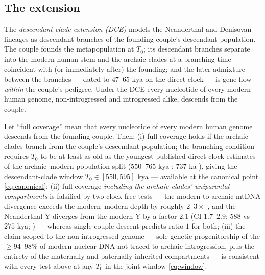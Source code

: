 \subsection{The extension}
The \emph{descendant-clade extension (DCE)} models the Neanderthal and
Denisovan lineages as descendant branches of the founding couple's
descendant population. The couple founds the metapopulation at $T_0$; its
descendant branches separate into the modern-human stem and the archaic
clades at a branching time coincident with (or immediately after) the
founding; and the later admixture between the branches --- dated to
$47$--$65$ kya on the direct clock \citep{Sankararaman2012} --- is gene flow
\emph{within} the couple's pedigree. Under the DCE every nucleotide of every
modern human genome, non-introgressed and introgressed alike, descends from
the couple.

\begin{theorem}\label{thm:scope}
Let ``full coverage'' mean that every nucleotide of every modern human
genome descends from the founding couple. Then:
(i) full coverage holds if the archaic clades branch from the couple's
descendant population; the branching condition requires $T_0$ to be at
least as old as the youngest published direct-clock estimates of the
archaic--modern population split ($550$--$765$ kya \citep{Pruefer2014};
$737$ ka \citealp{Rogers2020}), giving the descendant-clade window
$T_0 \in [550, 595]$ kya --- available at the canonical point
\eqref{eq:canonical};
(ii) full coverage \emph{including the archaic clades' uniparental
compartments} is falsified by two clock-free tests --- the
modern-to-archaic mtDNA divergence exceeds the modern--modern depth by
roughly $2$--$3\times$ \citep{Green2008,Posth2017}, and the Neanderthal Y
diverges from the modern Y by a factor $2.1$ (CI $1.7$--$2.9$; $588$ vs
$275$ kya; \citealp{Mendez2016}) --- whereas single-couple descent predicts
ratio $1$ for both;
(iii) the claim scoped to the non-introgressed genome --- sole genetic
progenitorship of the $\ge 94$--$98\%$ of modern nuclear DNA not traced to
archaic introgression, plus the entirety of the maternally and paternally
inherited compartments --- is consistent with every test above at any $T_0$
in the joint window \eqref{eq:window}.
\end{theorem}

